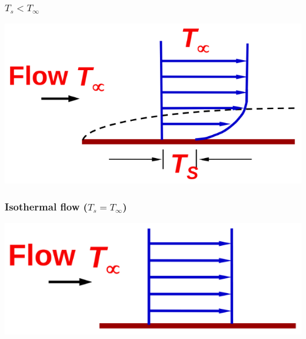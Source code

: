 \documentclass[11pt]{article}
\begin{document}
\subsubsection{\(T_s < T_{\infty}\)}
\label{sec:org1e47160}
\begin{center}
\includegraphics[width=.9\linewidth]{./images/temperature-profile-ts-less-than-t-infinity.png}
\end{center}

\subsubsection{Isothermal flow (\(T_s = T_{\infty}\))}
\label{sec:org239b211}
\begin{center}
\includegraphics[width=.9\linewidth]{./images/temperature-profile-isothermal-flow.png}
\end{center}
\end{document}
